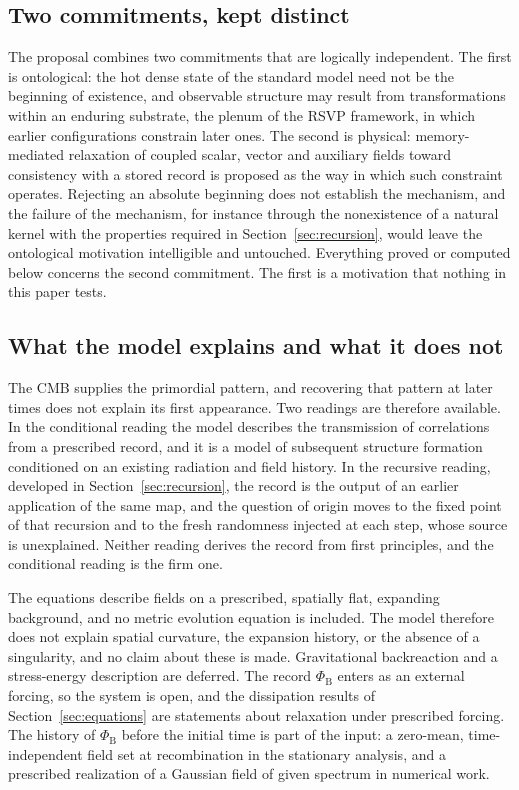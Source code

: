 \documentclass[11pt]{article}
\theoremstyle{definition}
\theoremstyle{remark}
\newcommand{\Phib}{{\Phi_{\mathrm{B}}}}
\begin{document}
\subsection{Two commitments, kept distinct}

The proposal combines two commitments that are logically independent. The first is ontological: the hot dense state of the standard model need not be the beginning of existence, and observable structure may result from transformations within an enduring substrate, the plenum of the RSVP framework, in which earlier configurations constrain later ones. The second is physical: memory-mediated relaxation of coupled scalar, vector and auxiliary fields toward consistency with a stored record is proposed as the way in which such constraint operates. Rejecting an absolute beginning does not establish the mechanism, and the failure of the mechanism, for instance through the nonexistence of a natural kernel with the properties required in Section~\ref{sec:recursion}, would leave the ontological motivation intelligible and untouched. Everything proved or computed below concerns the second commitment. The first is a motivation that nothing in this paper tests.

\subsection{What the model explains and what it does not}\label{sec:scope}

The CMB supplies the primordial pattern, and recovering that pattern at later times does not explain its first appearance. Two readings are therefore available. In the conditional reading the model describes the transmission of correlations from a prescribed record, and it is a model of subsequent structure formation conditioned on an existing radiation and field history. In the recursive reading, developed in Section~\ref{sec:recursion}, the record is the output of an earlier application of the same map, and the question of origin moves to the fixed point of that recursion and to the fresh randomness injected at each step, whose source is unexplained. Neither reading derives the record from first principles, and the conditional reading is the firm one.

The equations describe fields on a prescribed, spatially flat, expanding background, and no metric evolution equation is included. The model therefore does not explain spatial curvature, the expansion history, or the absence of a singularity, and no claim about these is made. Gravitational backreaction and a stress-energy description are deferred. The record $\Phib$ enters as an external forcing, so the system is open, and the dissipation results of Section~\ref{sec:equations} are statements about relaxation under prescribed forcing. The history of $\Phib$ before the initial time is part of the input: a zero-mean, time-independent field set at recombination in the stationary analysis, and a prescribed realization of a Gaussian field of given spectrum in numerical work.
\end{document}
